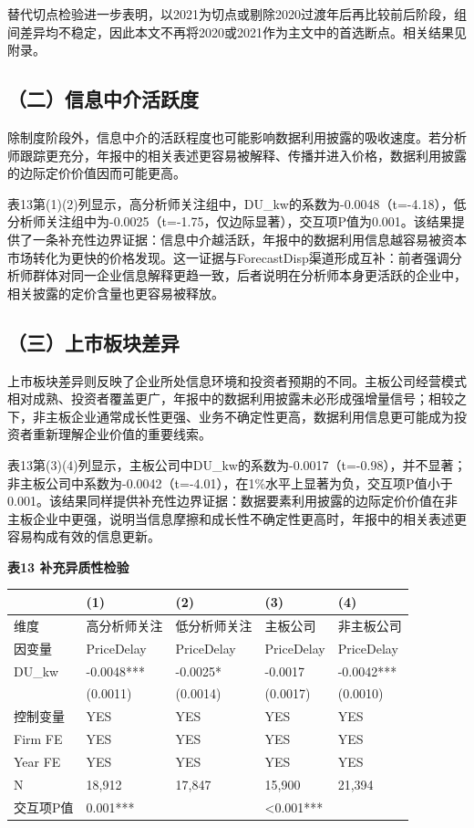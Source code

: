 替代切点检验进一步表明，以2021为切点或剔除2020过渡年后再比较前后阶段，组间差异均不稳定，因此本文不再将2020或2021作为主文中的首选断点。相关结果见附录。

\subsection{（二）信息中介活跃度}\label{ux4e8cux4fe1ux606fux4e2dux4ecbux6d3bux8dc3ux5ea6}

除制度阶段外，信息中介的活跃程度也可能影响数据利用披露的吸收速度。若分析师跟踪更充分，年报中的相关表述更容易被解释、传播并进入价格，数据利用披露的边际定价价值因而可能更高。

表13第(1)(2)列显示，高分析师关注组中，DU\_kw的系数为-0.0048（t=-4.18），低分析师关注组中为-0.0025（t=-1.75，仅边际显著），交互项P值为0.001。该结果提供了一条补充性边界证据：信息中介越活跃，年报中的数据利用信息越容易被资本市场转化为更快的价格发现。这一证据与ForecastDisp渠道形成互补：前者强调分析师群体对同一企业信息解释更趋一致，后者说明在分析师本身更活跃的企业中，相关披露的定价含量也更容易被释放。

\subsection{（三）上市板块差异}\label{ux4e09ux4e0aux5e02ux677fux5757ux5deeux5f02}

上市板块差异则反映了企业所处信息环境和投资者预期的不同。主板公司经营模式相对成熟、投资者覆盖更广，年报中的数据利用披露未必形成强增量信号；相较之下，非主板企业通常成长性更强、业务不确定性更高，数据利用信息更可能成为投资者重新理解企业价值的重要线索。

表13第(3)(4)列显示，主板公司中DU\_kw的系数为-0.0017（t=-0.98），并不显著；非主板公司中系数为-0.0042（t=-4.01），在1\%水平上显著为负，交互项P值小于0.001。该结果同样提供补充性边界证据：数据要素利用披露的边际定价价值在非主板企业中更强，说明当信息摩擦和成长性不确定性更高时，年报中的相关表述更容易构成有效的信息更新。

\textbf{表13 补充异质性检验}

{\def\LTcaptype{} %
\begin{longtable}[]{@{}lllll@{}}
\toprule\noalign{}
& (1) & (2) & (3) & (4) \\
\midrule\noalign{}
\endhead
\bottomrule\noalign{}
\endlastfoot
维度 & 高分析师关注 & 低分析师关注 & 主板公司 & 非主板公司 \\
因变量 & PriceDelay & PriceDelay & PriceDelay & PriceDelay \\
DU\_kw & -0.0048*** & -0.0025* & -0.0017 & -0.0042*** \\
& (0.0011) & (0.0014) & (0.0017) & (0.0010) \\
控制变量 & YES & YES & YES & YES \\
Firm FE & YES & YES & YES & YES \\
Year FE & YES & YES & YES & YES \\
N & 18,912 & 17,847 & 15,900 & 21,394 \\
交互项P值 & 0.001*** & & \textless0.001*** & \\
\end{longtable}
}

